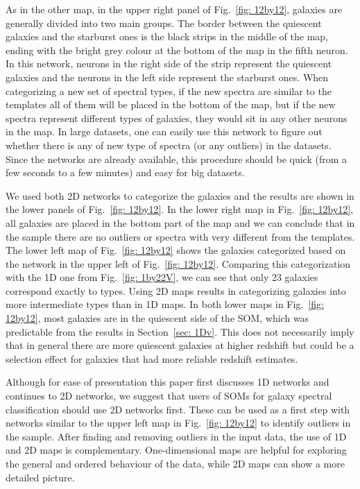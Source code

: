         As in the other map, in the upper right panel of Fig.~\ref{fig: 12by12}, galaxies are generally divided into two main groups.
        The border between the quiescent galaxies and the starburst ones is the black strips in the middle of the map, ending with the bright grey colour at the bottom of the map in the fifth neuron.
        In this network, neurons in the right side of the strip represent the quiescent galaxies and the neurons in the left side represent the starburst ones. 
        When categorizing a new set of spectral types, if the new spectra are similar to the  templates all of them will be placed in the bottom of the map, but if the new spectra represent different types of galaxies, they would sit in any other neurons in the map.
        In large datasets, one can easily use this network to figure out whether there is any of new type of spectra (or any outliers) in the datasets. 
        Since the networks are already available, this procedure should be quick (from a few seconds to a few minutes) and easy for big datasets.
          
    
        We used both 2D networks to categorize the  galaxies and the results are shown in the lower panels of Fig.~\ref{fig: 12by12}.
        In the lower right map in Fig.~\ref{fig: 12by12}, all galaxies are placed in the bottom part of the map and we can conclude that in the  sample there are no outliers or spectra with very different from the  templates.
        The lower left map of Fig.~\ref{fig: 12by12} shows the  galaxies categorized based on the network in the upper left of Fig.~\ref{fig: 12by12}. 
        Comparing this categorization with the 1D one from Fig.~\ref{fig: 1by22V}, we can see that only 23 galaxies correspond exactly to  types.
        Using 2D maps results in categorizing galaxies into more intermediate types than in 1D maps.
        In both lower maps in Fig.~\ref{fig: 12by12}, most galaxies are in the quiescent side of the SOM, which was predictable from the results in Section~\ref{sec: 1Dv}.
        This does not necessarily imply that in general there are more quiescent galaxies at higher redshift but could be a selection effect for galaxies that had more reliable redshift estimates.
        
    Although for ease of presentation this paper first discusses 1D networks and continues to 2D networks, we suggest that users of SOMs for galaxy spectral classification should use 2D networks first.
         These can be used as a first step with networks similar to the upper left map in Fig.~\ref{fig: 12by12} to identify outliers in the sample.
        After finding and removing outliers in the input data, the use of 1D and 2D maps is complementary.
        One-dimensional maps are helpful for exploring the general and ordered behaviour of the data, while 2D maps can show a more detailed picture.
 

